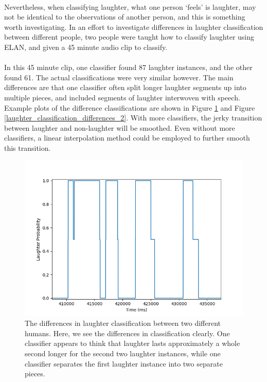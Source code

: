 \documentclass[a4paper,11pt,notitlepage]{article}
\begin{document}
\\
Nevertheless, when classifying laughter, what one person `feels' is laughter, may not be identical to the observations of another person, and this is something worth investigating. In an effort to investigate differences in laughter classification between different people, two people were taught how to classify laughter using ELAN, and given a 45 minute audio clip to classify.\\
\\
In this 45 minute clip, one classifier found 87 laughter instances, and the other found 61. The actual classifications were very similar however. The main differences are that one classifier often split longer laughter segments up into multiple pieces, and included segments of laughter interwoven with speech. Example plots of the difference classifications are shown in Figure \ref{laughter_classification_differences_1} and Figure \ref{laughter_classification_differences_2}. With more classifiers, the jerky transition between laughter and non-laughter will be smoothed. Even without more classifiers, a linear interpolation method could be employed to further smooth this transition.
\begin{figure}[H]
	\centering
	\vspace{0.5cm}
	\includegraphics[scale = 0.75]{figs/differences_1.png}
	\caption{The differences in laughter classification between two different humans. Here, we see the differences in classification clearly. One classifier appears to think that laughter lasts approximately a whole second longer for the second two laughter instances, while one classifier separates the first laughter instance into two separate pieces.}
	\label{laughter_classification_differences_1}
\end{figure}
\end{document}
